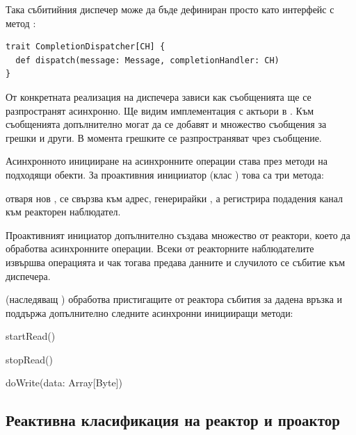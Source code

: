 Така събитийния диспечер може да бъде дефиниран просто като интерфейс с метод :

\begin{lstlisting}
trait CompletionDispatcher[CH] {
  def dispatch(message: Message, completionHandler: CH)
}
\end{lstlisting}

От конкретната реализация на диспечера зависи как съобщенията ще се разпространят асинхронно. Ще видим имплементация с актьори в . Към съобщенията допълнително могат да се добавят и множество съобщения за грешки и други. В момента грешките се разпространяват чрез  съобщение.

Асинхронното иницииране на асинхронните операции става през методи на подходящи обекти. За проактивния иницииатор (клас ) това са три метода:

\begin{itemize*}
  \item {}
  \item {}
  \item {}
\end{itemize*}

 отваря нов ,  се свързва към адрес, генерирайки , а  регистрира подадения канал към реакторен наблюдател.

Проактивният инициатор допълнително създава множество от реактори, което да обработва асинхронните операции. Всеки от реакторните наблюдателите извършва операцията и чак тогава предава данните и случилото се събитие към диспечера.

 (наследяващ ) обработва пристигащите от реактора събития за дадена връзка и поддържа допълнително следните асинхронни иницииращи методи:

\begin{itemize*}
  \item startRead()
  \item stopRead()
  \item doWrite(data: Array[Byte])
\end{itemize*}

\subsection{Реактивна класификация на реактор и проактор}

